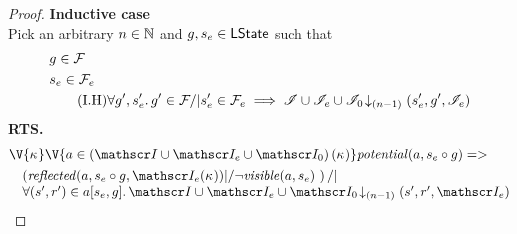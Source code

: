 \begin{lemma}
\begin{proof}
\noindent\textbf{Inductive case }\\
Pick an arbitrary $n \in \mathbb{N}$ and $g, s_e \in \textsf{LState}$ such that
%
\begin{align}
	& g \in  \mathcal{F}_{} \label{LEC:Ass1}\\
	& s_e \in \mathcal{F}_{e} \label{LEC:Ass2}\\
	& \tag{I.H} \forall g', s_e'.\,  g' \in \mathcal{F}_{} /| s'_e \in \mathcal{F}_{e} \implies \mathscr{I} \cup \mathscr{I}_{e} \cup \mathscr{I}_0 \!\downarrow_{(n-1)} \left(s_e', g', \mathscr{I}_{e}\right) \label{LEC:IH}
\end{align}
%
\textbf{RTS.}
%
\begin{align}
%  
  &\V{\ca{}}\V{a\in \left(\lmod \cup \lmod_e \cup \lmod_0 \right) (\ca{})}
  \m{potential}(a,s_e \composeL g) =>\null \nonumber \\
	& \quad
	\begin{array}{@{} l @{}}
		\left(\m{reflected}(a,s_e \composeL g, \lmod_e(\ca{})) |/ \neg\m{visible}(a, s_e) \ \right) /| \\
		\for{(s', r') \in a[s_e, g]} \extendsAMUpto{\lmod \cup \lmod_e \cup \lmod_0}{(n-1)}{s'}{r'}{\lmod_e}
 	\end{array} 
  \label{LEC:Goal3}
\end{align}
%
%



\end{proof}
\end{lemma}
